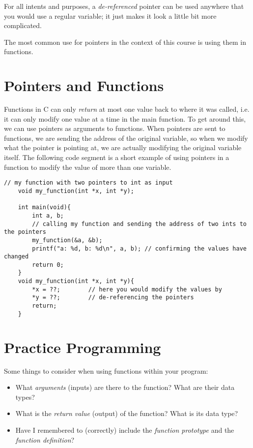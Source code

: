 \documentclass{pass}
\begin{document}
For all intents and purposes, a \textit{de-referenced} pointer can be used anywhere that you would use a regular variable; it just makes it look a little bit more complicated.

The most common use for pointers in the context of this course is using them in functions.


\section*{Pointers and Functions}
Functions in C can only \textit{return} at most one value back to where it was called, i.e. it can only modify one value at a time in the main function. To get around this, we can use pointers as arguments to functions. When pointers are sent to functions, we are sending the address of the original variable, so when we modify what the pointer is pointing at, we are actually modifying the original variable itself. The following code segment is a short example of using pointers in a function to modify the value of more than one variable.

\begin{lstlisting}[style=CStyle]
	// my function with two pointers to int as input
	void my_function(int *x, int *y);
	
	int main(void){
		int a, b;
		// calling my function and sending the address of two ints to the pointers
		my_function(&a, &b);
		printf("a: %d, b: %d\n", a, b); // confirming the values have changed
		return 0;
	}
	void my_function(int *x, int *y){
		*x = ??;		// here you would modify the values by
		*y = ??;		// de-referencing the pointers
		return;
	}
\end{lstlisting}

\pagebreak

\section*{Practice Programming}
Some things to consider when using functions within your program:
\begin{itemize}
\item What \textit{arguments} (inputs) are there to the function? What are their data types?
\item What is the \textit{return value} (output) of the function? What is its data type?
\item Have I remembered to (correctly) include the \textit{function prototype} and the \textit{function definition}?\\
\end{itemize}
\end{document}
